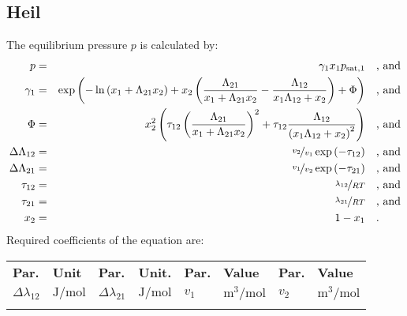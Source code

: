 %
\subsection{Heil}
\label{cha:approaches:abs:act:heil}
%
The equilibrium pressure $p$ is calculated by:
%
\begin{equation*}
	\begin{split}
		p &=& \gamma_1 x_1 p_\mathrm{sat,1} & \quad\text{, and} \\
		\gamma_1 &=& \exp \left( - \ln \left( x_1 + \Lambda_{21} x_2 \right) + x_2 \left( \frac{\Lambda_{21}}{x_1 + \Lambda_{21} x_2} - \frac{\Lambda_{12}}{x_1 \Lambda_{12} + x_2} \right) + \Phi \right) & \quad\text{, and} \\
		\Phi &=& x_2^2 \left( \tau_{12} \left( \frac{\Lambda_{21}}{x_1 + \Lambda_{21} x_2} \right) ^2 + \tau_{12} \frac{\Lambda_{12}}{\left( x_1 \Lambda_{12} + x_2 \right) ^2}  \right) & \quad\text{, and} \\
		\Delta\Lambda_{12} &=& \nicefrac{v_2}{v_1} \exp \left( - \tau_{12} \right) & \quad\text{, and} \\
		\Delta\Lambda_{21} &=& \nicefrac{v_1}{v_2} \exp \left( - \tau_{21} \right) & \quad\text{, and} \\
		\tau_{12} &=& \nicefrac{\lambda_{12}}{R T} & \quad\text{, and} \\
		\tau_{21} &=& \nicefrac{\lambda_{21}}{R T} & \quad\text{, and} \\
		x_2 &=& 1 - x_1  & \quad\text{.} \\
	\end{split}
\end{equation*}
%
Required coefficients of the equation are:
%
\begin{longtable}[l]{ll|ll|ll|ll}
\toprule
\addlinespace
\textbf{Par.} & \textbf{Unit} & \textbf{Par.} &	\textbf{Unit.} & \textbf{Par.} & \textbf{Value} & \textbf{Par.} & \textbf{Value} \\
\addlinespace
\midrule
\endhead

\bottomrule
\endfoot
\bottomrule
\endlastfoot
\addlinespace

$\Delta\lambda_{12}$ & $\si{\joule\per\mole}$ &$\Delta\lambda_{21}$ & $\si{\joule\per\mole}$ & $v_1$ & $\si{\cubic\meter\per\mole}$& $v_2$ & $\si{\cubic\meter\per\mole}$ \\

\addlinespace
\end{longtable}
